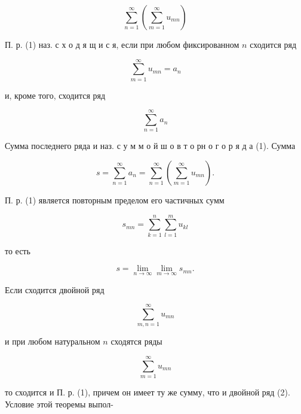 \documentclass[10pt]{article}
\begin{document}
\[

\sum_{n=1}^{\infty}\left(\sum_{m=1}^{\infty} u_{m n}\right)

\]



П. р. (1) наз. с х о д я щ и с я, если при любом фиксированном $n$ сходится ряд



\[

\sum_{m=1}^{\infty} u_{m n}=a_{n}

\]



и, кроме того, сходится ряд



\[

\sum_{n=1}^{\infty} a_{n}

\]



Сумма последнего ряда и наз. с у м м о й ш о в т о рн о г о р я д а (1). Сумма



\[

s=\sum_{n=1}^{\infty} a_{n}=\sum_{n=1}^{\infty}\left(\sum_{m=1}^{\infty} u_{m n}\right) .

\]



П. р. (1) является повторным пределом его частичных сумм



\[

s_{m n}=\sum_{k=1}^{n} \sum_{l=1}^{m} u_{k l}

\]



то есть



\[

s=\lim _{n \rightarrow \infty} \lim _{m \rightarrow \infty} s_{m n} .

\]



Если сходится двойной ряд



\[

\sum_{m, n=1}^{\infty} u_{m n}

\]



и при любом натуральном $n$ сходятся ряды



\[

\sum_{m=1}^{\infty} u_{m n}

\]



то сходится и П. р. (1), причем он имеет ту же сумму, что и двойной ряд (2). Условие этой теоремы выпол-
\end{document}

